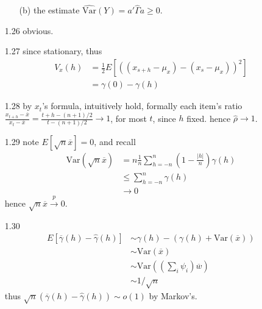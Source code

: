 \documentclass[paper=a4, fontsize=11pt]{scrartcl} %
\numberwithin{equation}{section} %
\numberwithin{figure}{section} %
\numberwithin{table}{section} %
\def \var {\text{Var}}
\begin{document}
\begin{itemize}
\begin{itemize}
		\item[(b)] the estimate $\widehat{\var}(Y)=a'\widehat{\Gamma}a\geq 0$.
	\end{itemize}
	\item[1.26] obvious.
	\item[1.27] since stationary, thus
	\begin{align}
		V_x(h) &= \frac{1}{2} E[((x_{s+h}-\mu_x)- (x_s-\mu_x))^2]\\
			&= \gamma(0) - \gamma(h)
	\end{align}
	\item[1.28] by $x_t$'s formula, intuitively hold, formally each item's ratio $\frac{x_{t+h}-\overline{x}}{x_t-\overline{x}}=\frac{t+h-(n+1)/2}{t-(n+1)/2}\rightarrow 1$, for most $t$, since $h$ fixed. hence $\widehat{\rho}\rightarrow 1$.
	\item[1.29] note $E[\sqrt{n}\overline{x}]=0$, and recall
	\begin{align}
		\var(\sqrt{n} \overline{x}) &= n\frac{1}{n}\sum_{h=-n}^n(1-\frac{|h|}{n})\gamma(h)\\
			&\leq \sum_{h=-n}^n\gamma(h)\\
			&\rightarrow 0
	\end{align}
	hence $\sqrt{n}\overline{x}\stackrel{p}{\rightarrow}0$.
	\item[1.30]
	\begin{align}
		E[\overline{\gamma}(h)- \widehat{\gamma}(h)] &\sim \gamma(h)-(\gamma(h)+\var(\overline{x}))\\
			&\sim \var(\overline{x})\\
			&\sim \var((\sum_i \psi_i)\overline{w})\\
			&\sim 1/\sqrt{n}
	\end{align}
	thus $\sqrt{n}(\overline{\gamma}(h)- \widehat{\gamma}(h)) \sim o(1)$ by Markov's.
\end{itemize}
\end{document}
